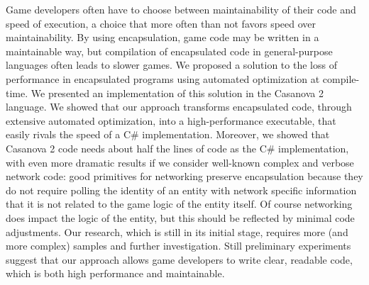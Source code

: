 Game developers often have to choose between maintainability of their code and speed of execution, a choice that more often than not favors speed over maintainability. By using encapsulation, game code may be written in a maintainable way, but compilation of encapsulated code in general-purpose languages often leads to slower games. We proposed a solution to the loss of performance in encapsulated programs using automated optimization at compile-time. 
We presented an implementation of this solution in the Casanova 2 language. We showed that our approach transforms encapsulated code, through extensive automated optimization, into a high-performance executable, that easily rivals the speed of a C\# implementation. Moreover, we showed that Casanova 2 code needs about half the lines of code as the C\# implementation, with even more dramatic results if we consider well-known complex and verbose network code: good primitives for networking preserve encapsulation because they do not require polling the identity of an entity with network specific information that it is not related to the game logic of the entity itself. Of course networking does impact the logic of the entity, but this should be reflected by minimal code adjustments. Our research, which is still in its initial stage, requires more (and more complex) samples and further investigation. Still preliminary experiments suggest that our approach allows game developers to write clear, readable code, which is both high performance and maintainable.




